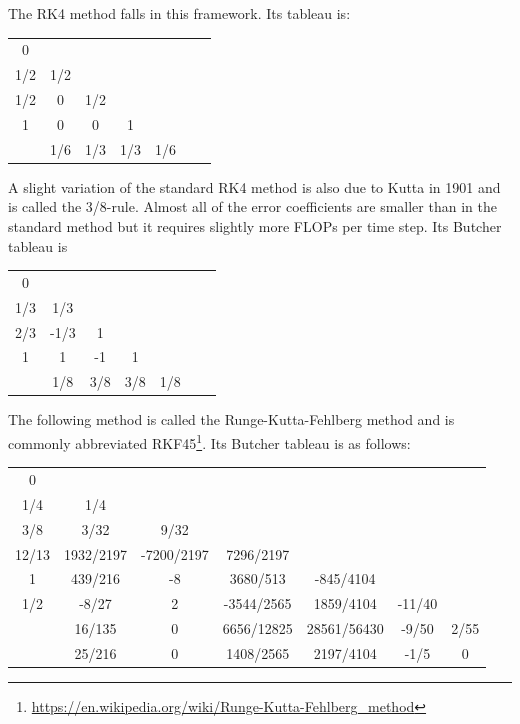 The RK4 method falls in this framework. Its tableau is:

\begin{mdframed}[backgroundcolor=blue!5]
\begin{tabular}{c|cccccc}
0 & \\
1/2 & 1/2 \\
1/2 & 0 & 1/2 \\
1 & 0 & 0 & 1 \\
\hline
 & 1/6 & 1/3 & 1/3 & 1/6 
\end{tabular}
\end{mdframed}

A slight variation of the standard RK4 method is also due to Kutta in 1901 and is called the 3/8-rule. 
Almost all of the error coefficients are smaller than in the standard method but it requires 
slightly more FLOPs per time step. Its Butcher tableau is

\begin{mdframed}[backgroundcolor=blue!5]
\begin{tabular}{c|cccccc}
0 & \\
1/3 & 1/3 \\
2/3 & -1/3 & 1 \\
1 & 1 & -1 & 1 \\
\hline
 & 1/8 & 3/8 & 3/8 & 1/8 
\end{tabular}
\end{mdframed}


 
The following method is called the Runge-Kutta-Fehlberg method and is 
commonly abbreviated 
RKF45\footnote{\url{https://en.wikipedia.org/wiki/Runge-Kutta-Fehlberg_method}}. 
Its Butcher tableau is as follows: 

\begin{mdframed}[backgroundcolor=blue!5]
\begin{tabular}{c|cccccc}
0 & \\
1/4 	&1/4\\ 
3/8 	&3/32 		&9/32 \\
12/13 	&1932/2197 	&-7200/2197 &	7296/2197\\
1 	&439/216 	&-8 	&3680/513 &	-845/4104\\
1/2 	&-8/27 		&2 	&-3544/2565& 	1859/4104 &	-11/40 	\\
\hline
&16/135 	&0 		&6656/12825 	&28561/56430 	&-9/50& 	2/55\\
&25/216 	&0 	&1408/2565 	&2197/4104 	&-1/5 	&0 
\end{tabular}
\end{mdframed}


